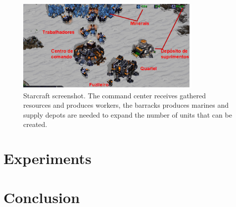 \documentclass[conference]{IEEEtran}
\begin{document}
\begin{figure}[ht]
    \centerline{\includegraphics[width=9cm]{img/scsshot.png}}
    \caption{Starcraft screenshot. The command center receives gathered resources and produces workers, the barracks produces marines and supply depots are needed to expand the number of units that can be created.}
    \label{fig:scsshot}
\end{figure}

\section{Experiments}
\label{sec:experiments}




\section{Conclusion}
\label{sec:conclusion}


%
%
\end{document}
